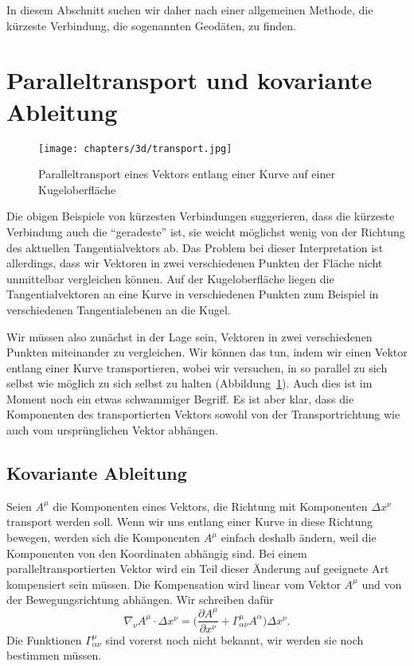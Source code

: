 In diesem Abschnitt suchen wir daher nach einer allgemeinen Methode,
die kürzeste Verbindung, die sogenannten Geodäten, zu finden.

\section{Paralleltransport und kovariante Ableitung}
\begin{figure}
\centering
\texttt{[image: chapters/3d/transport.jpg]}
\caption{Paralleltransport eines Vektors entlang einer Kurve auf
einer Kugeloberfläche%
\label{skript:geodaten:fig:transport}}
\end{figure}
Die obigen Beispiele von kürzesten Verbindungen suggerieren, dass die kürzeste
Verbindung auch die ``geradeste'' ist, sie weicht möglichst wenig von
der Richtung des aktuellen Tangentialvektors ab.
Das Problem bei dieser Interpretation ist allerdings, dass wir Vektoren
in zwei verschiedenen Punkten der Fläche nicht unmittelbar vergleichen
können.
Auf der Kugeloberfläche liegen die Tangentialvektoren an eine Kurve in
verschiedenen Punkten zum Beispiel in verschiedenen Tangentialebenen
an die Kugel.

Wir müssen also zunächst in der Lage sein, Vektoren in zwei verschiedenen
Punkten miteinander zu vergleichen.
Wir können das tun, indem wir einen Vektor entlang einer Kurve transportieren,
wobei wir versuchen, in so parallel zu sich selbst wie möglich zu sich
selbst zu halten (Abbildung~\ref{skript:geodaten:fig:transport}).
Auch dies ist im Moment noch ein etwas schwammiger Begriff. 
Es ist aber klar, dass die Komponenten des transportierten Vektors
sowohl von der Transportrichtung wie auch vom ursprünglichen Vektor
abhängen.

\subsection{Kovariante Ableitung}
Seien $A^\mu$ die Komponenten eines Vektors, die Richtung mit Komponenten
$\Delta x^\nu$ transport werden soll.
Wenn wir uns entlang einer Kurve in diese Richtung bewegen, werden sich
die Komponenten $A^\mu$ einfach deshalb ändern, weil die Komponenten von
den Koordinaten abhängig sind.
Bei einem paralleltransportierten Vektor wird ein Teil dieser Änderung
auf geeignete Art kompensiert sein müssen.
Die Kompensation wird linear vom Vektor $A^\mu$ und von der
Bewegungsrichtung abhängen.
Wir schreiben dafür
\[
\nabla_\nu A^\mu\cdot \Delta x^\nu
=
\biggl(\frac{\partial A^\mu}{\partial x^\nu}
+
\Gamma^\mu_{\alpha\nu}A^\alpha\biggr)\Delta x^\nu.
\]
Die Funktionen $\Gamma^\mu_{\alpha\nu}$ sind vorerst noch nicht bekannt,
wir werden sie noch bestimmen müssen.

